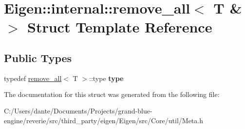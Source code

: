 \hypertarget{struct_eigen_1_1internal_1_1remove__all_3_01_t_01_6_01_4}{}\section{Eigen\+::internal\+::remove\+\_\+all$<$ T \& $>$ Struct Template Reference}
\label{struct_eigen_1_1internal_1_1remove__all_3_01_t_01_6_01_4}
\subsection*{Public Types}
\begin{DoxyCompactItemize}
\item 
\mbox{\label{struct_eigen_1_1internal_1_1remove__all_3_01_t_01_6_01_4_abc07582f72a90e08a201f91760b34682}} 
typedef \mbox{\hyperlink{struct_eigen_1_1internal_1_1remove__all}{remove\+\_\+all}}$<$ T $>$\+::type {\bfseries type}
\end{DoxyCompactItemize}


The documentation for this struct was generated from the following file\+:\begin{DoxyCompactItemize}
\item 
C\+:/\+Users/dante/\+Documents/\+Projects/grand-\/blue-\/engine/reverie/src/third\+\_\+party/eigen/\+Eigen/src/\+Core/util/Meta.\+h\end{DoxyCompactItemize}
